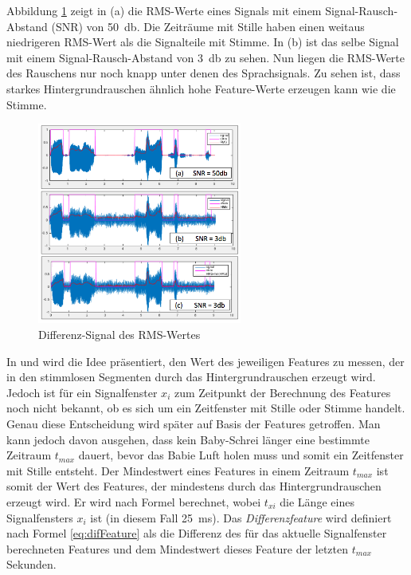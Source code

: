 Abbildung \ref{img:min-signal} zeigt in (a) die RMS-Werte eines Signals mit einem Signal-Rausch-Abstand (SNR) von \SI{50}{\decibel}. Die Zeiträume mit Stille haben einen weitaus niedrigeren RMS-Wert als die Signalteile mit Stimme. In (b) ist das selbe Signal mit einem Signal-Rausch-Abstand von \SI{3}{\decibel} zu sehen. Nun liegen die RMS-Werte des Rauschens nur noch knapp unter denen des Sprachsignals. Zu sehen ist, dass starkes Hintergrundrauschen ähnlich hohe Feature-Werte erzeugen kann wie die Stimme.

\begin{figure}[h]
	\centering
	\includegraphics[width=0.6\textwidth]{bilder/min-signal.png}
	\caption{Differenz-Signal des RMS-Wertes}
	\label{img:min-signal}
\end{figure}

In \cite{vad_Easy} und \cite{vad_entropy} wird die Idee präsentiert, den Wert des jeweiligen Features zu messen, der in den stimmlosen Segmenten durch das Hintergrundrauschen erzeugt wird. Jedoch ist für ein Signalfenster $x_i$ zum Zeitpunkt der Berechnung des Features noch nicht bekannt, ob es sich um ein Zeitfenster mit Stille oder Stimme handelt. Genau diese Entscheidung wird später auf Basis der Features getroffen. Man kann jedoch davon ausgehen, dass kein Baby-Schrei länger eine bestimmte Zeitraum $t_{max}$ dauert, bevor das Babie Luft holen muss und somit ein Zeitfenster mit Stille entsteht. Der Mindestwert eines Features in einem Zeitraum  $t_{max}$ ist somit der Wert des Features, der mindestens durch das Hintergrundrauschen erzeugt wird. Er wird nach Formel \label{ref:minFeat} berechnet, wobei $t_{xi}$ die Länge eines Signalfensters $x_i$ ist (in diesem Fall \SI{25}{\milli\second}). Das \emph{Differenzfeature} wird definiert nach Formel \ref{eq:difFeature} als die Differenz des für das aktuelle Signalfenster berechneten Features und dem Mindestwert dieses Feature der letzten $t_{max}$ Sekunden.


